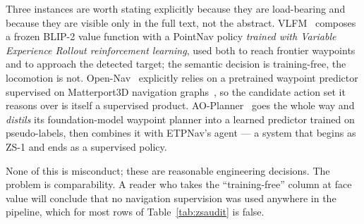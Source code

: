 \documentclass[journal]{IEEEtran}
\begin{document}
Three instances are worth stating explicitly because they are load-bearing
and because they are visible only in the full text, not the abstract.
VLFM~\cite{yokoyama2024vlfm} composes a frozen BLIP-2 value function with a
PointNav policy \emph{trained with Variable Experience Rollout
reinforcement learning}, used both to reach frontier waypoints and to
approach the detected target; the semantic decision is training-free, the
locomotion is not. Open-Nav~\cite{qiao2025open} explicitly relies on a
pretrained waypoint predictor supervised on Matterport3D navigation
graphs~\cite{chen2025constraint}, so the candidate action set it reasons
over is itself a supervised product. AO-Planner~\cite{chen2024affordances}
goes the whole way and \emph{distils} its foundation-model waypoint planner
into a learned predictor trained on pseudo-labels, then combines it with
ETPNav's agent --- a system that begins as ZS-1 and ends as a supervised
policy.

None of this is misconduct; these are reasonable engineering decisions. The
problem is comparability. A reader who takes the ``training-free'' column at
face value will conclude that no navigation supervision was used anywhere in
the pipeline, which for most rows of Table~\ref{tab:zsaudit} is false.
\end{document}
